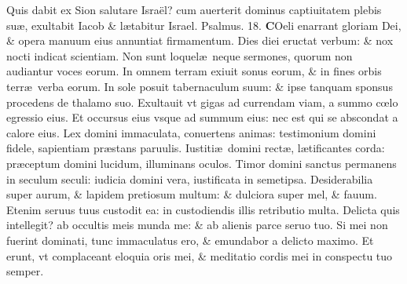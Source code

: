 \documentclass[a5paper,10pt]{book}
\def\ae{æ}
\def\oe{œ}
\begin{document}
\begin{multicols*}{2}
\newline \color{red} Q\color{black}uis dabit ex Sion salutare Israël? cum auerterit dominus captiuitatem plebis su\ae , exultabit Iacob \& l\ae tabitur Israel. \quad \color{red} Psalmus. \hypertarget{ps18}{18.} \color{black}
\vspace{-.5em}
\lettrine[lines=2]{\bfseries \color{red} C}{}Oeli enarrant gloriam Dei, \& opera manuum eius annuntiat firmamentum.
\newline \color{red} D\color{black}ies diei eructat verbum: \& nox nocti indicat scientiam.
\newline \color{red} N\color{black}on sunt loquel\ae \ neque sermones, quorum non audiantur voces eorum.
\newline \color{red} I\color{black}n omnem terram exiuit sonus eorum, \& in fines orbis terr\ae \ verba eorum.
\newline \color{red} I\color{black}n sole posuit tabernaculum suum: \& ipse tanquam sponsus procedens de thalamo suo.
\newline \color{red} E\color{black}xultauit vt gigas ad currendam viam, a summo c\oe lo egressio eius.
\newline \color{red} E\color{black}t occursus eius vsque ad summum eius: nec est qui se abscondat a calore eius.
\newline \color{red} L\color{black}ex domini immaculata, conuertens animas: testimonium domini fidele, sapientiam pr\ae stans paruulis.
\newline \color{red} I\color{black}ustiti\ae \ domini rect\ae , l\ae tificantes corda: pr\ae ceptum domini lucidum, illuminans oculos.
\newline \color{red} T\color{black}imor domini sanctus permanens in seculum seculi: iudicia domini vera, iustificata in semetipsa.
\newline \color{red} D\color{black}esiderabilia super aurum, \& lapidem pretiosum multum: \& dulciora super mel, \& fauum.
\newline \color{red} E\color{black}tenim seruus tuus custodit ea: in custodiendis illis retributio multa.
\newline \color{red} D\color{black}elicta quis intellegit? ab occultis meis munda me: \& ab alienis parce seruo tuo.
\newline \color{red} S\color{black}i mei non fuerint dominati, tunc immaculatus ero, \& emundabor a delicto maximo.
\newline \color{red} E\color{black}t erunt, vt complaceant eloquia oris mei, \& meditatio cordis mei in conspectu tuo semper.

\end{multicols*}
\end{document}
